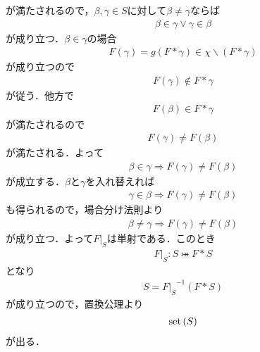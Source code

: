 \begin{prf}
\begin{description}
				が満たされるので，$\beta,\gamma \in S$に対して$\beta \neq \gamma$ならば
				\begin{align}
					\beta \in \gamma \vee \gamma \in \beta
				\end{align}
				が成り立つ．$\beta \in \gamma$の場合
				\begin{align}
					F(\gamma) = g(F \ast \gamma) \in \chi \backslash (F \ast \gamma)
				\end{align}
				が成り立つので
				\begin{align}
					F(\gamma) \notin F \ast \gamma
				\end{align}
				が従う．他方で
				\begin{align}
					F(\beta) \in F \ast \gamma
				\end{align}
				が満たされるので
				\begin{align}
					F(\gamma) \neq F(\beta)
				\end{align}
				が満たされる．よって
				\begin{align}
					\beta \in \gamma \Longrightarrow F(\gamma) \neq F(\beta)
				\end{align}
				が成立する．$\beta$と$\gamma$を入れ替えれば
				\begin{align}
					\gamma \in \beta \Longrightarrow F(\gamma) \neq F(\beta)
				\end{align}
				も得られるので，場合分け法則より
				\begin{align}
					\beta \neq \gamma \Longrightarrow F(\gamma) \neq F(\beta)
				\end{align}
				が成り立つ．よって$F|_S$は単射である．このとき
				\begin{align}
					F|_S:S \bij F \ast S
				\end{align}
				となり
				\begin{align}
					S = {F|_S}^{-1}(F \ast S)
				\end{align}
				が成り立つので，置換公理より
				\begin{align}
					\operatorname*{set} \left(S\right)
				\end{align}
				が出る．
				

\end{description}
\end{prf}
